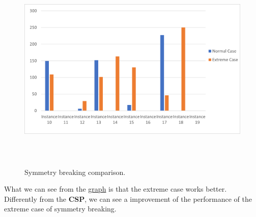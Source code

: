 \begin{figure}[!h]
 \centering
 \includegraphics[width=14cm, height=10cm]{images/sym_breaking_smt_comparison.png}
 \caption{Symmetry breaking comparison.}
 \label{fig:sym-breaking-comparison}
\end{figure}

What we can see from the \hyperref[fig:sym-breaking-comparison]{graph} is that the extreme case works better.\\

Differently from the \textbf{CSP}, we can see a improvement of the performance of the extreme case of symmetry breaking. 

\clearpage